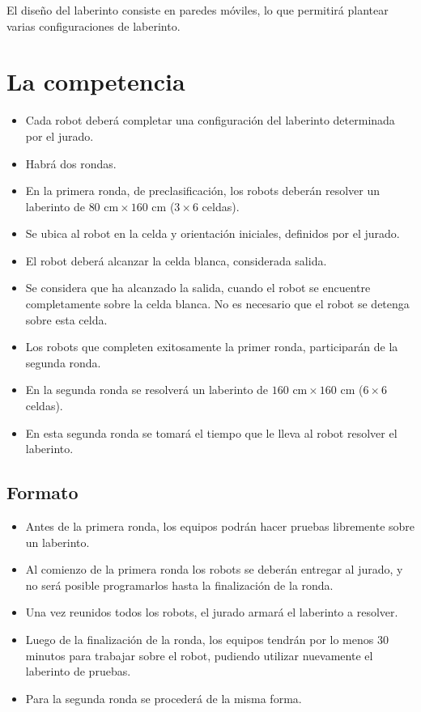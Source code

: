 \documentclass[a4paper,11pt]{article}
\newcommand{\cm}{\ensuremath{\mbox{~cm}}}
\begin{document}
El diseño del laberinto consiste en paredes móviles, lo que permitirá plantear varias configuraciones de laberinto.

\section*{La competencia}
\begin{itemize}
  \item Cada robot deberá completar una configuración del laberinto determinada por el jurado.
  \item Habrá dos rondas.
  \item En la primera ronda, de preclasificación, los robots deberán resolver un laberinto de $80\cm \times 160\cm$ ($3 \times 6$ celdas).
  \item Se ubica al robot en la celda y orientación iniciales, definidos por el jurado.
  \item El robot deberá alcanzar la celda blanca, considerada salida.
  \item Se considera que ha alcanzado la salida, cuando el robot se encuentre completamente sobre la celda blanca. No es necesario que el robot se detenga sobre esta celda.
  \item Los robots que completen exitosamente la primer ronda, participarán de la segunda ronda.
  \item En la segunda ronda se resolverá un laberinto de $160\cm \times 160\cm$ ($6 \times 6$ celdas).
  \item En esta segunda ronda se tomará el tiempo que le lleva al robot resolver el laberinto.
\end{itemize}


\subsection*{Formato}
\begin{itemize}
  \item Antes de la primera ronda, los equipos podrán hacer pruebas libremente sobre un laberinto.
  \item Al comienzo de la primera ronda los robots se deberán entregar al jurado, y no será posible programarlos hasta la finalización de la ronda.
  \item Una vez reunidos todos los robots, el jurado armará el laberinto a resolver.
  \item Luego de la finalización de la ronda, los equipos tendrán por lo menos 30 minutos para trabajar sobre el robot, pudiendo utilizar nuevamente el laberinto de pruebas.
  \item Para la segunda ronda se procederá de la misma forma.
\end{itemize}    
\end{document}
